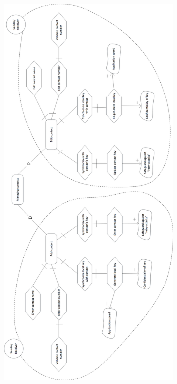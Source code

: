 \begin{center}
 \includegraphics[height=20cm]{diagrams/IStarDiagrams/SMSEncryptionIStarContacts.png}
\end{center}